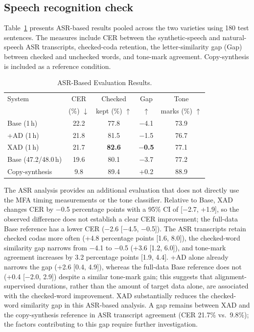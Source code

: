 \documentclass[conference,a4paper]{IEEEtran}
\begin{document}
\subsection{Speech recognition check}
Table~\ref{tab:asr} presents ASR-based results pooled across the two varieties using 180 test sentences. The measures include CER between the synthetic-speech and natural-speech ASR transcripts, checked-coda retention, the letter-similarity gap (Gap) between checked and unchecked words, and tone-mark agreement. Copy-synthesis is included as a reference condition.

\begin{table}[H]
\centering
\caption{ASR-Based Evaluation Results.}
\label{tab:asr}
\footnotesize
\setlength{\tabcolsep}{3.2pt}
\begin{tabular}{lcccc}
\toprule
System & CER & Checked & Gap & Tone \\
 & (\%) $\downarrow$ & kept (\%) $\uparrow$ & $\uparrow$ & marks (\%) $\uparrow$ \\
\midrule
Base (1\,h)          & 22.2 & 77.8 & $-$4.1 & 73.9 \\
+AD (1\,h)           & 21.8 & 81.5 & $-$1.5 & 76.7 \\
XAD (1\,h)           & 21.7 & \textbf{82.6} & \textbf{$-$0.5} & 77.1 \\
Base (47.2/48.0\,h)  & 19.6 & 80.1 & $-$3.7 & 77.2 \\
\midrule
Copy-synthesis       & 9.8  & 89.4 & +0.2 & 88.9 \\
\bottomrule
\end{tabular}
\end{table}

The ASR analysis provides an additional evaluation that does not directly use the MFA timing measurements or the tone classifier. Relative to Base, XAD changes CER by $-$0.5 percentage points with a 95\% CI of [$-$2.7, +1.9], so the observed difference does not establish a clear CER improvement; the full-data Base reference has a lower CER ($-$2.6 [$-$4.5, $-$0.5]). The ASR transcripts retain checked codas more often (+4.8 percentage points [1.6, 8.0]), the checked-word similarity gap narrows from $-$4.1 to $-$0.5 (+3.6 [1.2, 6.0]), and tone-mark agreement increases by 3.2 percentage points [1.9, 4.4]. +AD alone already narrows the gap (+2.6 [0.4, 4.9]), whereas the full-data Base reference does not (+0.4 [$-$2.0, 2.9]) despite a similar tone-mark gain; this suggests that alignment-supervised durations, rather than the amount of target data alone, are associated with the checked-word improvement. XAD substantially reduces the checked-word similarity gap in this ASR-based analysis. A gap remains between XAD and the copy-synthesis reference in ASR transcript agreement (CER 21.7\% vs.\ 9.8\%); the factors contributing to this gap require further investigation.
\end{document}
